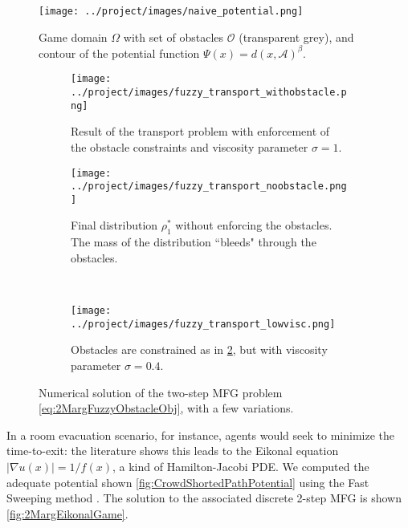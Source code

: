 \documentclass[../report.tex]{subfiles}
\begin{document}
\begin{figure}[h]
	\centering
	\texttt{[image: ../project/images/naive\_potential.png]}
	\caption{Game domain $\Omega$ with set of obstacles $\mathscr{O}$ (transparent grey), and contour of the potential function $\Psi(x) = d(x, \mathscr A)^\beta$.} \label{fig:CrowdExamplePotential}	
\end{figure}


\begin{figure}[h]
	\centering
	\begin{subfigure}[t]{.70\linewidth}
	\texttt{[image: ../project/images/fuzzy\_transport\_withobstacle.png]}
	\caption{Result of the transport problem with enforcement of the obstacle constraints and viscosity parameter $\sigma=1$.}\label{fig:2MargFuzzyTransportObstacles}
	\end{subfigure}
	\begin{subfigure}[t]{.34\linewidth}
	\centering
	\texttt{[image: ../project/images/fuzzy\_transport\_noobstacle.png]}
	\caption{Final distribution $\rho^*_1$ without enforcing the obstacles. The mass of the distribution ``bleeds" through the obstacles. }\label{fig:2MargFuzzyTransportRelaxedObst}
	\end{subfigure}~
	\begin{subfigure}[t]{.34\linewidth}
	\centering
	\texttt{[image: ../project/images/fuzzy\_transport\_lowvisc.png]}
	\caption{Obstacles are constrained as in \cref{fig:2MargFuzzyTransportObstacles}, but with viscosity parameter $\sigma=0.4$.}\label{fig:2MargFuzzyTransportLowVisc}
	\end{subfigure}
	\caption{Numerical solution of the two-step MFG problem \eqref{eq:2MargFuzzyObstacleObj}, with a few variations.}\label{fig:2MargFuzzyTransportMarginals}
\end{figure}

\begin{remark}\label{rem:SmartPotential}
In a room evacuation scenario, for instance, agents would seek to minimize the time-to-exit: the literature shows this leads to the Eikonal equation $|\nabla u(x)| = 1/f(x)$, a kind of Hamilton-Jacobi PDE. We computed the adequate potential shown \cref{fig:CrowdShortedPathPotential} using the Fast Sweeping method \parencite{Zhao2004AFS}. The solution to the associated discrete 2-step MFG is shown \cref{fig:2MargEikonalGame}.
\end{remark}
\end{document}
